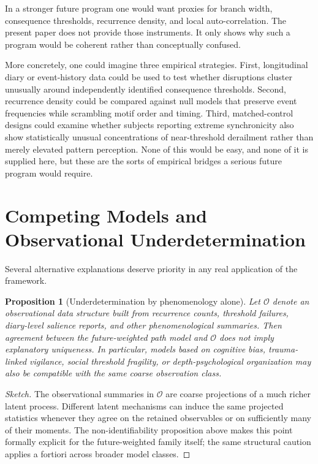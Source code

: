 \documentclass[12pt]{article}
\newtheorem{proposition}{Proposition}
\begin{document}
In a stronger future program one would want proxies for branch width, consequence thresholds, recurrence density, and local auto-correlation. The present paper does not provide those instruments. It only shows why such a program would be coherent rather than conceptually confused.

More concretely, one could imagine three empirical strategies. First, longitudinal diary or event-history data could be used to test whether disruptions cluster unusually around independently identified consequence thresholds. Second, recurrence density could be compared against null models that preserve event frequencies while scrambling motif order and timing. Third, matched-control designs could examine whether subjects reporting extreme synchronicity also show statistically unusual concentrations of near-threshold derailment rather than merely elevated pattern perception. None of this would be easy, and none of it is supplied here, but these are the sorts of empirical bridges a serious future program would require.

\section{Competing Models and Observational Underdetermination}

Several alternative explanations deserve priority in any real application of the framework.

\begin{proposition}[Underdetermination by phenomenology alone]
Let $\mathcal O$ denote an observational data structure built from recurrence counts, threshold failures, diary-level salience reports, and other phenomenological summaries. Then agreement between the future-weighted path model and $\mathcal O$ does not imply explanatory uniqueness. In particular, models based on cognitive bias, trauma-linked vigilance, social threshold fragility, or depth-psychological organization may also be compatible with the same coarse observation class.
\end{proposition}

\begin{proof}[Sketch]
The observational summaries in $\mathcal O$ are coarse projections of a much richer latent process. Different latent mechanisms can induce the same projected statistics whenever they agree on the retained observables or on sufficiently many of their moments. The non-identifiability proposition above makes this point formally explicit for the future-weighted family itself; the same structural caution applies a fortiori across broader model classes.
\end{proof}
\end{document}
